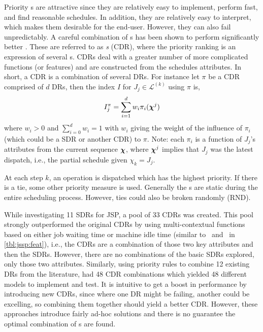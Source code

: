 \documentclass[smallextended]{svjour3}
\begin{document}
	Priority \dr s are attractive since they are relatively easy to 
	implement, perform fast, and find reasonable schedules. In addition, they are relatively 
	easy to interpret, which makes them desirable for the end-user.
	However, they can also fail unpredictably. 
	A careful combination of \dr s has been shown to perform significantly better 
	\cite{Jayamohan04}. These are referred to as \emph{\cdr s} 
	(CDR), where the priority ranking is an expression of several \dr s. 
	CDRs deal with a greater number of more complicated functions (or features) and are
	constructed from the schedules attributes. In short, a CDR is a combination of 
	several DRs. 
	For instance let $\pi$ be a CDR comprised of $d$ DRs, then the index $I$ for 
	$J_j\in\mathcal{L}^{(k)}$ using $\pi$ is, 
	\begin{equation}	I_j^{\pi} = \sum_{i=1}^d w_i \pi_i(\bm \chi^j) 
	\label{eq:CDR}
	\end{equation}
	where $w_i>0$ and $\sum_{i=0}^d w_i = 1$ with $w_i$ giving the weight of the 
	influence of $\pi_i$ (which could be a SDR or another CDR) to $\pi$. Note: 
	each $\pi_i$ is a function of $J_j$'s attributes from the current sequence 
	$\bm \chi$, where $\bm \chi^j$ implies that $J_j$ was the latest dispatch, i.e., the 
	partial schedule given $\chi_k=J_j$.
	
	At each step $k$, an operation is dispatched which has the highest 
	priority.  If there is a tie, some other priority measure is used. Generally 
	the \dr s are static during the entire scheduling process. However, ties could 
	also be broken randomly (RND). 
	
	While investigating 11 SDRs for JSP, \cite{Lu13} a pool of 33 CDRs was created. 
	This pool strongly outperformed the original CDRs by using multi-contextual 
	functions based on either job waiting time or machine idle time (similar 
	to \phiwait\ and \phimacSlack\ in \cref{tbl:jssp:feat}), i.e., the CDRs are a 
	combination of those two key attributes and then the SDRs.
	However, there are no combinations of the basic SDRs explored, only those two 
	attributes.  
	Similarly, using priority rules to combine 12 existing DRs from the literature, 
	\cite{Yu13} had 48 CDR combinations which yielded 48 different models 
	to implement and test. 
	It is intuitive to get a boost in performance by introducing new CDRs, since 
	where one DR might be failing, another could be excelling, so combining them 
	together should yield a better CDR. However, these approaches introduce fairly 
	ad-hoc solutions and there is no guarantee the optimal combination of 
	\dr s are found.
	
\end{document}
